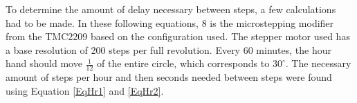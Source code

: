 \documentclass[11pt]{article}
\begin{document}



To determine the amount of delay necessary between steps, a few calculations had to be made. In these following equations, 8 is the microstepping modifier from the TMC2209 based on the configuration used. The stepper motor used has a base resolution of 200 steps per full revolution. Every 60 minutes, the hour hand should move $\frac{1}{12}$ of the entire circle, which corresponds to $30^\circ$. The necessary amount of steps per hour and then seconds needed between steps were found using Equation \ref{EqHr1} and \ref{EqHr2}.
\end{document}
